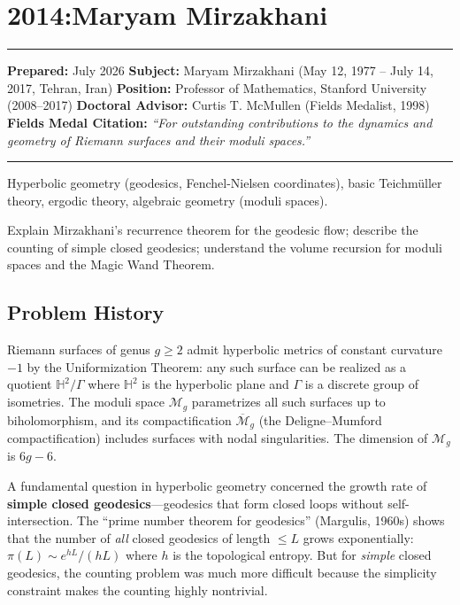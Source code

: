 \chapter{2014:Maryam Mirzakhani}\label{ch2014maryammirzakhani:maryam-mirzakhani-fields-medal-2014-a-comprehensive-report-on-her-work-and-impact}

\begin{center}\rule{0.5\linewidth}{0.5pt}\end{center}

\textbf{Prepared:} July 2026 \textbf{Subject:} Maryam Mirzakhani (May 12, 1977 -- July 14, 2017, Tehran, Iran) \textbf{Position:} Professor of Mathematics, Stanford University (2008--2017) \textbf{Doctoral Advisor:} Curtis T. McMullen (Fields Medalist, 1998) \textbf{Fields Medal Citation:} \emph{``For outstanding contributions to the dynamics and geometry of Riemann surfaces and their moduli spaces.''}

\begin{center}\rule{0.5\linewidth}{0.5pt}\end{center}

\begin{prereqs} Hyperbolic geometry (geodesics, Fenchel-Nielsen coordinates), basic Teichm\"uller theory, ergodic theory, algebraic geometry (moduli spaces). \end{prereqs}

\begin{objectives} Explain Mirzakhani's recurrence theorem for the geodesic flow; describe the counting of simple closed geodesics; understand the volume recursion for moduli spaces and the Magic Wand Theorem. \end{objectives}

\section{Problem History}

Riemann surfaces of genus $g \ge 2$ admit hyperbolic metrics of constant curvature $-1$ by the Uniformization Theorem: any such surface can be realized as a quotient $\mathbb{H}^2/\Gamma$ where $\mathbb{H}^2$ is the hyperbolic plane and $\Gamma$ is a discrete group of isometries. The moduli space $\mathcal{M}_g$ parametrizes all such surfaces up to biholomorphism, and its compactification $\overline{\mathcal{M}}_g$ (the Deligne--Mumford compactification) includes surfaces with nodal singularities. The dimension of $\mathcal{M}_g$ is $6g-6$.

A fundamental question in hyperbolic geometry concerned the growth rate of \textbf{simple closed geodesics}---geodesics that form closed loops without self-intersection. The ``prime number theorem for geodesics'' (Margulis, 1960s) shows that the number of \emph{all} closed geodesics of length $\le L$ grows exponentially: $\pi(L) \sim e^{hL}/(hL)$ where $h$ is the topological entropy. But for \emph{simple} closed geodesics, the counting problem was much more difficult because the simplicity constraint makes the counting highly nontrivial.


